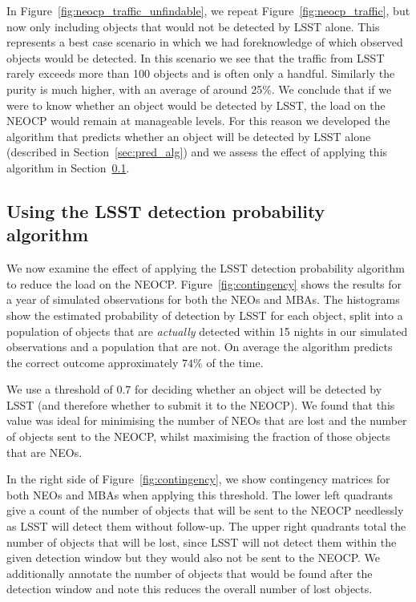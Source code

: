 \documentclass[twocolumn]{aastex631}
\newcommand{\efficiencyAlg}{74}
\newcommand{\thresholdAlg}{0.7}
\begin{document}
In Figure~\ref{fig:neocp_traffic_unfindable}, we repeat Figure~\ref{fig:neocp_traffic}, but now only including objects that would not be detected by LSST alone. This represents a best case scenario in which we had foreknowledge of which observed objects would be detected. In this scenario we see that the traffic from LSST rarely exceeds more than 100 objects and is often only a handful. Similarly the purity is much higher, with an average of around 25\%. We conclude that if we were to know whether an object would be detected by LSST, the load on the NEOCP would remain at manageable levels. For this reason we developed the algorithm that predicts whether an object will be detected by LSST alone (described in Section~\ref{sec:pred_alg}) and we assess the effect of applying this algorithm in Section~\ref{sec:using_alg}.

\subsection{Using the LSST detection probability algorithm}\label{sec:using_alg}
We now examine the effect of applying the LSST detection probability algorithm to reduce the load on the NEOCP. Figure~\ref{fig:contingency} shows the results for a year of simulated observations for both the NEOs and MBAs. The histograms show the estimated probability of detection by LSST for each object, split into a population of objects that are \textit{actually} detected within 15 nights in our simulated observations and a population that are not. On average the algorithm predicts the correct outcome approximately $\efficiencyAlg{}\%$ of the time.

We use a threshold of $\thresholdAlg{}$ for deciding whether an object will be detected by LSST (and therefore whether to submit it to the NEOCP). We found that this value was ideal for minimising the number of NEOs that are lost and the number of objects sent to the NEOCP, whilst maximising the fraction of those objects that are NEOs.

In the right side of Figure~\ref{fig:contingency}, we show contingency matrices for both NEOs and MBAs when applying this threshold. The lower left quadrants give a count of the number of objects that will be sent to the NEOCP needlessly as LSST will detect them without follow-up. The upper right quadrants total the number of objects that will be lost, since LSST will not detect them within the given detection window but they would also not be sent to the NEOCP. We additionally annotate the number of objects that would be found after the detection window and note this reduces the overall number of lost objects.
\end{document}
